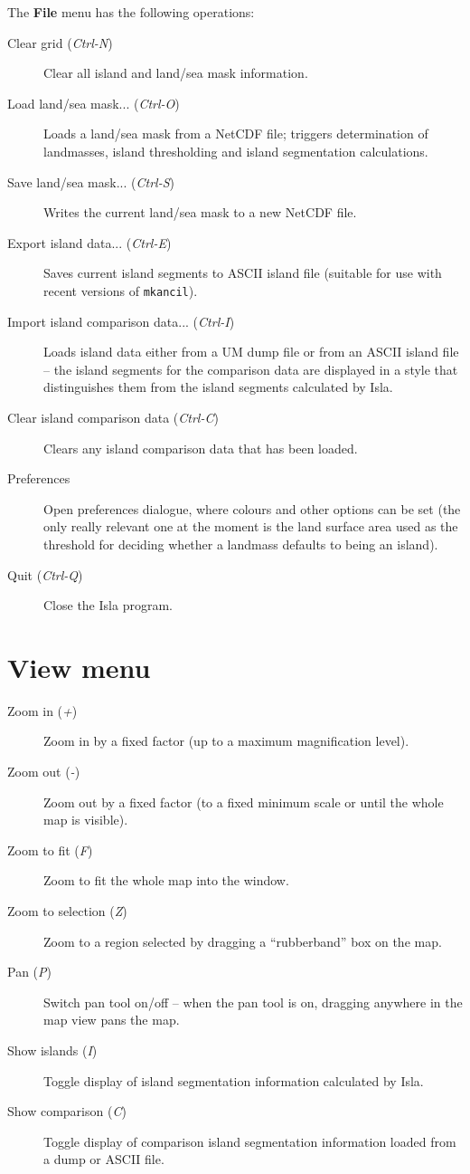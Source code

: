 \documentclass[11pt,makeidx,texhelp]{report}
\begin{document}
The \textbf{File} menu has the following operations:
\begin{description}
  \item[Clear grid (\textit{Ctrl-N})]{Clear all island and land/sea
    mask information.}
  \item[Load land/sea mask... (\textit{Ctrl-O})]{Loads a land/sea mask
    from a NetCDF file; triggers determination of landmasses, island
    thresholding and island segmentation calculations.}
  \item[Save land/sea mask... (\textit{Ctrl-S})]{Writes the current
    land/sea mask to a new NetCDF file.}
  \item[Export island data... (\textit{Ctrl-E})]{Saves current island
    segments to ASCII island file (suitable for use with recent
    versions of \texttt{mkancil}).}
  \item[Import island comparison data... (\textit{Ctrl-I})]{Loads
    island data either from a UM dump file or from an ASCII island
    file -- the island segments for the comparison data are displayed
    in a style that distinguishes them from the island segments
    calculated by Isla.}
  \item[Clear island comparison data (\textit{Ctrl-C})]{Clears any
    island comparison data that has been loaded.}
  \item[Preferences]{Open preferences dialogue, where colours and
    other options can be set (the only really relevant one at the
    moment is the land surface area used as the threshold for deciding
    whether a landmass defaults to being an island).}
  \item[Quit (\textit{Ctrl-Q})]{Close the Isla program.}
\end{description}

\section{View menu}

\begin{description}
  \item[Zoom in (\textit{+})]{Zoom in by a fixed factor (up to a
    maximum magnification level).}
  \item[Zoom out (\textit{-})]{Zoom out by a fixed factor (to a fixed
    minimum scale or until the whole map is visible).}
  \item[Zoom to fit (\textit{F})]{Zoom to fit the whole map into the
    window.}
  \item[Zoom to selection (\textit{Z})]{Zoom to a region selected by
    dragging a ``rubberband'' box on the map.}
  \item[Pan (\textit{P})]{Switch pan tool on/off -- when the pan tool
    is on, dragging anywhere in the map view pans the map.}
  \item[Show islands (\textit{I})]{Toggle display of island
    segmentation information calculated by Isla.}
  \item[Show comparison (\textit{C})]{Toggle display of comparison
    island segmentation information loaded from a dump or ASCII file.}
\end{description}
\end{document}
